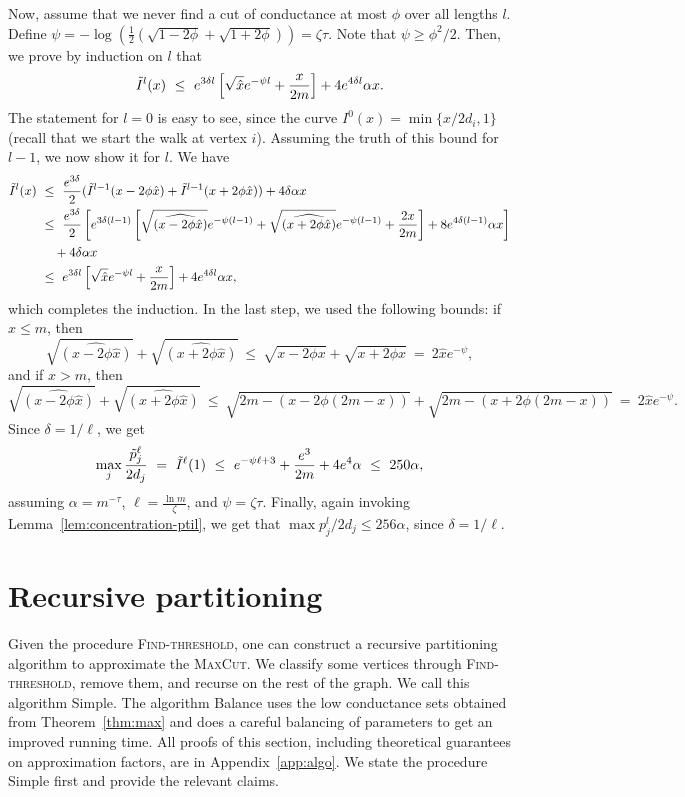 \documentclass[11pt]{article}
\newcommand\Balance{{\sc Balance}\xspace}
\newcommand\Find{\textsc{Find-threshold}\xspace}
\newcommand\Simple{{\sc Simple}\xspace}
\def\maxcut{\textsc{MaxCut}\xspace}
\begin{document}
Now, assume that we never find a cut of conductance at most $\phi$ over all lengths $l$. Define $\psi = -\log(\frac{1}{2}(\sqrt{1-2\phi} + \sqrt{1+2\phi})) = \zeta\tau$. Note that $\psi \geq \phi^2/2$. Then, we prove by induction on $l$ that
$$\tilde{I}^l(x)\ \leq\ e^{3\delta l}\left[\sqrt{\hat{x}}e^{-\psi l} + \frac{x}{2m}\right] + 4e^{4\delta l}\alpha x.$$ The statement for $l = 0$ is easy to see, since the curve
$I^0(x) = \min\{x/2d_i, 1\}$ (recall that we start the walk at vertex $i$).
Assuming the truth of this bound for $l-1$, we now show it for $l$. We have
\begin{align*}
\Itil^l(x)\ &\leq\ \frac{e^{3\delta}}{2}(\Itil^{l-1}(x - 2\phi \hat{x}) + \Itil^{l-1}(x + 2\phi \hat{x})) + 4\delta\alpha x \\
&\leq\ \frac{e^{3\delta}}{2}\left[e^{3\delta(l-1)}\left[\sqrt{\widehat{(x - 2\phi\hat{x})}}e^{-\psi(l-1)} + \sqrt{\widehat{(x + 2\phi\hat{x})}}e^{-\psi(l-1)}
+ \frac{2x}{2m}\right] + 8e^{4\delta(l-1)}\alpha x\right]\\
&\quad + 4\delta\alpha x \\
&\leq\ e^{3\delta l}\left[\sqrt{\hat{x}}e^{-\psi l} + \frac{x}{2m}\right] + 4 e^{4\delta l}\alpha x,
\end{align*}
which completes the induction. In the last step, we used the following bounds:
if $x \leq m$, then
$$\sqrt{\widehat{(x - 2\phi\hat{x})}} + \sqrt{\widehat{(x +2\phi\hat{x})}}\
\leq\ \sqrt{x - 2\phi x} + \sqrt{x +2\phi x}\ =\ 2\hat{x}e^{-\psi},$$ and if $x > m$, then
$$\sqrt{\widehat{(x - 2\phi\hat{x})}} + \sqrt{\widehat{(x +2\phi\hat{x})}}\
\leq\ \sqrt{2m - (x - 2\phi(2m - x))} + \sqrt{2m - (x + 2\phi(2m - x))}\
=\ 2\hat{x} e^{-\psi}.$$
Since $\delta = 1/\ell$, we get
$$\max_j \frac{\ptil^\ell_j}{2d_j}\ =\ \Itil^\ell(1)\ \leq\ e^{-\psi \ell + 3} + \frac{e^3}{2m} + 4e^4\alpha\ \leq\ 250\alpha,$$
assuming $\alpha = m^{-\tau}$, $\ell = \frac{\ln m}{\zeta}$, and $\psi = \zeta\tau$. Finally, again invoking Lemma~\ref{lem:concentration-ptil}, we get that $\max p^l_j/2d_j \leq 256\alpha$, since $\delta = 1/\ell$.



\section{Recursive partitioning} \label{sec:algo}

Given the procedure {\Find}, one can construct
a recursive partitioning algorithm to approximate the
{\maxcut}.
We classify some vertices through {\Find}, remove them,
and recurse on the rest of the graph. We call
this algorithm {\Simple}. The algorithm {\Balance}
uses the low conductance sets obtained from
Theorem~\ref{thm:max} and does a careful
balancing of parameters to get an improved
running time. All proofs of this section, including theoretical guarantees on approximation factors, are in Appendix~\ref{app:algo}. We state the procedure {\Simple}
first and provide the relevant claims.
\end{document}
